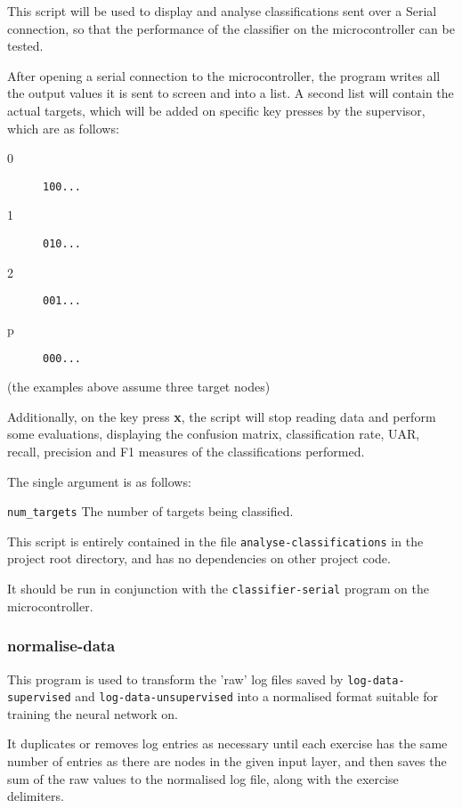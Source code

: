 \documentclass[a4paper]{article}
\begin{document}
This script will be used to display and analyse classifications sent over a Serial connection, so that the performance of the classifier on the microcontroller can be tested.

After opening a serial connection to the microcontroller, the program writes all the output values it is sent to screen and into a list. A second list will contain the actual targets, which will be added on specific key presses by the supervisor, which are as follows:

\begin{description}
\item[0] \lstinline|100...|
\item[1] \lstinline|010...|
\item[2] \lstinline|001...|
\item[p] \lstinline|000...|
\end{description}

(the examples above assume three target nodes)

Additionally, on the key press \textbf{x}, the script will stop reading data and perform some evaluations, displaying the confusion matrix, classification rate, UAR, recall, precision and F1 measures of the classifications performed.

The single argument is as follows:

\lstinline{num_targets} The number of targets being classified.

This script is entirely contained in the file \lstinline{analyse-classifications} in the project root directory, and has no dependencies on other project code.

It should be run in conjunction with the \lstinline{classifier-serial} program on the microcontroller.

\subsubsection{normalise-data}
\label{subsubsec:dc_csa_normalise}

This program is used to transform the 'raw' log files saved by \lstinline{log-data-supervised} and \lstinline{log-data-unsupervised} into a normalised format suitable for training the neural network on. 

It duplicates or removes log entries as necessary until each exercise has the same number of entries as there are nodes in the given input layer, and then saves the sum of the raw values to the normalised log file, along with the exercise delimiters.
\end{document}
